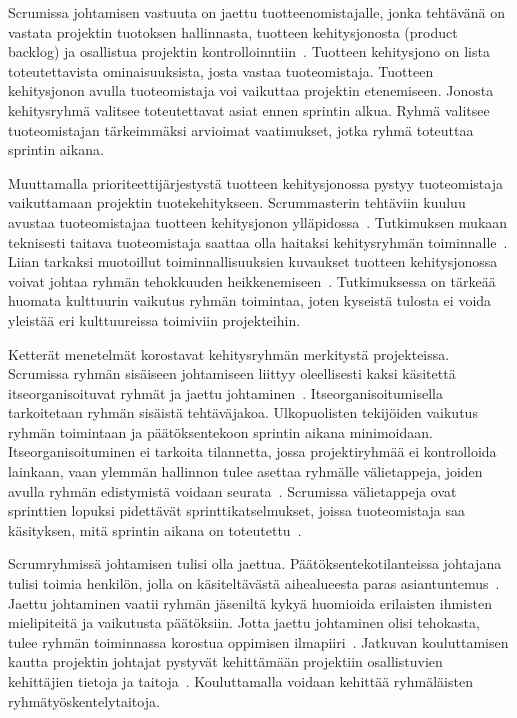 \documentclass[finnish]{tktltiki2}
\theoremstyle{definition}
\theoremstyle{remark}
\begin{document}
Scrumissa johtamisen vastuuta on jaettu tuotteenomistajalle, jonka tehtävänä on vastata projektin tuotoksen hallinnasta, tuotteen kehitysjonosta (product backlog) ja osallistua projektin kontrolloinntiin~\cite{4755768}. Tuotteen kehitysjono on lista toteutettavista ominaisuuksista, josta vastaa tuoteomistaja. Tuotteen kehitysjonon avulla tuoteomistaja voi vaikuttaa projektin etenemiseen. Jonosta kehitysryhmä valitsee toteutettavat asiat ennen sprintin alkua. Ryhmä valitsee tuoteomistajan tärkeimmäksi arvioimat vaatimukset, jotka ryhmä toteuttaa sprintin aikana. 

Muuttamalla prioriteettijärjestystä tuotteen kehitysjonossa pystyy tuoteomistaja vaikuttamaan projektin tuotekehitykseen. Scrummasterin tehtäviin kuuluu avustaa tuoteomistajaa tuotteen kehitysjonon ylläpidossa~\cite{Nerur:2005:CMA:1060710.1060712}. Tutkimuksen mukaan teknisesti taitava tuoteomistaja saattaa olla haitaksi kehitysryhmän toiminnalle~\cite{Nerur:2005:CMA:1060710.1060712}. Liian tarkaksi muotoillut toiminnallisuuksien kuvaukset tuotteen kehitysjonossa voivat johtaa ryhmän tehokkuuden heikkenemiseen~\cite{Nerur:2005:CMA:1060710.1060712}. Tutkimuksessa on tärkeää huomata kulttuurin vaikutus ryhmän toimintaa, joten kyseistä tulosta ei voida yleistää eri kulttuureissa toimiviin projekteihin.

Ketterät menetelmät korostavat kehitysryhmän merkitystä projekteissa. Scrumissa ryhmän sisäiseen johtamiseen liittyy oleellisesti kaksi käsitettä itseorganisoituvat ryhmät ja jaettu johtaminen~\cite{4755768}. Itseorganisoitumisella tarkoitetaan ryhmän sisäistä tehtäväjakoa. Ulkopuolisten tekijöiden vaikutus ryhmän toimintaan ja päätöksentekoon sprintin aikana minimoidaan. Itseorganisoituminen ei tarkoita tilannetta, jossa projektiryhmää ei kontrolloida lainkaan, vaan ylemmän hallinnon tulee asettaa ryhmälle välietappeja, joiden avulla ryhmän edistymistä voidaan seurata~\cite{Nerur:2005:CMA:1060710.1060712}. Scrumissa välietappeja ovat sprinttien lopuksi pidettävät sprinttikatselmukset, joissa tuoteomistaja saa käsityksen, mitä sprintin aikana on toteutettu~\cite{schwaber1995scrum}.

Scrumryhmissä johtamisen tulisi olla jaettua. Päätöksentekotilanteissa johtajana tulisi toimia henkilön, jolla on käsiteltävästä aihealueesta paras asiantuntemus~\cite{4755768}. Jaettu johtaminen vaatii ryhmän jäseniltä kykyä huomioida erilaisten ihmisten mielipiteitä ja vaikutusta päätöksiin. Jotta jaettu johtaminen olisi tehokasta, tulee ryhmän toiminnassa korostua oppimisen ilmapiiri~\cite{4755768}. Jatkuvan kouluttamisen kautta projektin johtajat pystyvät kehittämään projektiin osallistuvien kehittäjien tietoja ja taitoja~\cite{dall2004project}. Kouluttamalla voidaan kehittää ryhmäläisten ryhmätyöskentelytaitoja.
\end{document}
